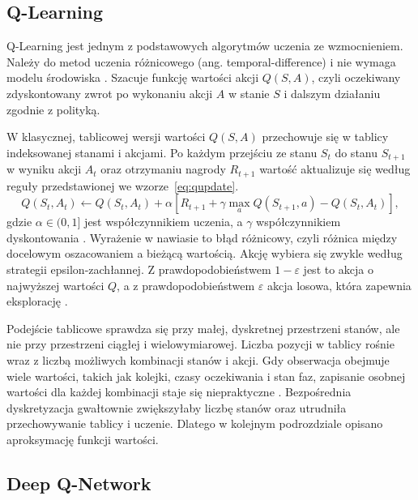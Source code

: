 \subsection{Q-Learning}
\label{subsec:qlearning}

Q-Learning jest jednym z podstawowych algorytmów uczenia ze wzmocnieniem. Należy do metod uczenia różnicowego (ang. temporal-difference) i nie wymaga modelu środowiska \cite{watkins1992qlearning, sutton2018reinforcement}. Szacuje funkcję wartości akcji $Q(S,A)$, czyli oczekiwany zdyskontowany zwrot po wykonaniu akcji $A$ w stanie $S$ i dalszym działaniu zgodnie z polityką.

W klasycznej, tablicowej wersji wartości $Q(S,A)$ przechowuje się w tablicy indeksowanej stanami i akcjami. Po każdym przejściu ze stanu $S_t$ do stanu $S_{t+1}$ w wyniku akcji $A_t$ oraz otrzymaniu nagrody $R_{t+1}$ wartość aktualizuje się według reguły przedstawionej we wzorze~\ref{eq:qupdate}.
\begin{equation}
    Q(S_t, A_t) \leftarrow Q(S_t, A_t) + \alpha \left[ R_{t+1} + \gamma \max_{a} Q(S_{t+1}, a) - Q(S_t, A_t) \right],
    \label{eq:qupdate}
\end{equation}
gdzie $\alpha \in (0,1]$ jest współczynnikiem uczenia, a $\gamma$ współczynnikiem dyskontowania \cite{watkins1992qlearning}. Wyrażenie w nawiasie to błąd różnicowy, czyli różnica między docelowym oszacowaniem a bieżącą wartością. Akcję wybiera się zwykle według strategii epsilon-zachłannej. Z prawdopodobieństwem $1-\varepsilon$ jest to akcja o najwyższej wartości $Q$, a z prawdopodobieństwem $\varepsilon$ akcja losowa, która zapewnia eksplorację \cite{sutton2018reinforcement}.

Podejście tablicowe sprawdza się przy małej, dyskretnej przestrzeni stanów, ale nie przy przestrzeni ciągłej i wielowymiarowej. Liczba pozycji w tablicy rośnie wraz z liczbą możliwych kombinacji stanów i akcji. Gdy obserwacja obejmuje wiele wartości, takich jak kolejki, czasy oczekiwania i stan faz, zapisanie osobnej wartości dla każdej kombinacji staje się niepraktyczne \cite{sutton2018reinforcement}. Bezpośrednia dyskretyzacja gwałtownie zwiększyłaby liczbę stanów oraz utrudniła przechowywanie tablicy i uczenie. Dlatego w kolejnym podrozdziale opisano aproksymację funkcji wartości.

\subsection{Deep Q-Network}
\label{subsec:dqn}

